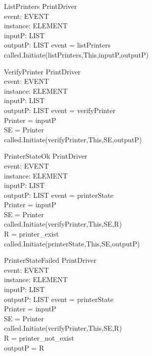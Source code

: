 \begin{schema}{ListPrinters}
\Delta PrintDriver \\
event: EVENT \\
instance: ELEMENT \\
inputP: LIST \\
outputP: LIST
\where event = listPrinters \\
called.Initiate(listPrinters,This,inputP,outputP)
\end{schema}

\begin{schema}{VerifyPrinter}
\Delta PrintDriver \\
event: EVENT \\
instance: ELEMENT \\
inputP: LIST \\
outputP: LIST
\where event = verifyPrinter \\
Printer = \head inputP \\
SE = \lseq Printer \rseq \\
called.Initiate(verifyPrinter,This,SE,outputP)
\end{schema}

\begin{schema}{PrinterStateOk}
\Delta PrintDriver \\
event: EVENT \\
instance: ELEMENT \\
inputP: LIST \\
outputP: LIST
\where event = printerState \\
Printer = \head inputP \\
SE = \lseq Printer \rseq \\
called.Initiate(verifyPrinter,This,SE,R) \\
R = printer\_exist \\
called.Initiate(printerState,This,SE,outputP)
\end{schema}

\begin{schema}{PrinterStateFailed}
\Delta PrintDriver \\
event: EVENT \\
instance: ELEMENT \\
inputP: LIST \\
outputP: LIST
\where event = printerState \\
Printer = \head inputP \\
SE = \lseq Printer \rseq \\
called.Initiate(verifyPrinter,This,SE,R) \\
R = printer\_not\_exist \\
outputP = R
\end{schema}

